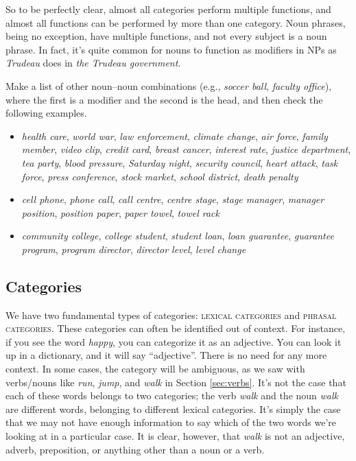 So to be perfectly clear, almost all categories perform multiple functions, and almost all functions can be performed by more than one category. Noun phrases, being no exception, have multiple functions, and not every subject is a noun phrase. In fact, it's quite common for nouns to function as modifiers in NPs as \textit{Trudeau} does in \textit{the Trudeau government}.

Make a list of other noun–noun combinations (e.g., \textit{soccer ball}, \textit{faculty office}), where the first is a modifier and the second is the head, and then check the following examples.

\begin{itemize}[noitemsep]
    \item \textit{health care}, \textit{world war}, \textit{law enforcement}, \textit{climate change}, \textit{air force}, \textit{family member}, \textit{video clip}, \textit{credit card}, \textit{breast cancer}, \textit{interest rate}, \textit{justice department}, \textit{tea party}, \textit{blood pressure}, \textit{Saturday night}, \textit{security council}, \textit{heart attack}, \textit{task force}, \textit{press conference}, \textit{stock market}, \textit{school district}, \textit{death penalty}
    \item \textit{cell phone}, \textit{phone call}, \textit{call centre}, \textit{centre stage}, \textit{stage manager}, \textit{manager position}, \textit{position paper}, \textit{paper towel}, \textit{towel rack}
    \item \textit{community college}, \textit{college student}, \textit{student loan}, \textit{loan guarantee}, \textit{guarantee program}, \textit{program director}, \textit{director level}, \textit{level change}
\end{itemize}

\subsection{Categories}

We have two fundamental types of categories: \textsc{lexical categories} and \textsc{phrasal categories}. These categories can often be identified out of context. For instance, if you see the word \textit{happy}, you can categorize it as an adjective. You can look it up in a dictionary, and it will say ``adjective''. There is no need for any more context. In some cases, the category will be ambiguous, as we saw with verbs/nouns like \textit{run}, \textit{jump}, and \textit{walk} in Section \ref{sec:verbs}. It's not the case that each of these words belongs to two categories; the verb \textit{walk} and the noun \textit{walk} are different words, belonging to different lexical categories. It's simply the case that we may not have enough information to say which of the two words we're looking at in a particular case. It is clear, however, that \textit{walk} is not an adjective, adverb, preposition, or anything other than a noun or a verb.

